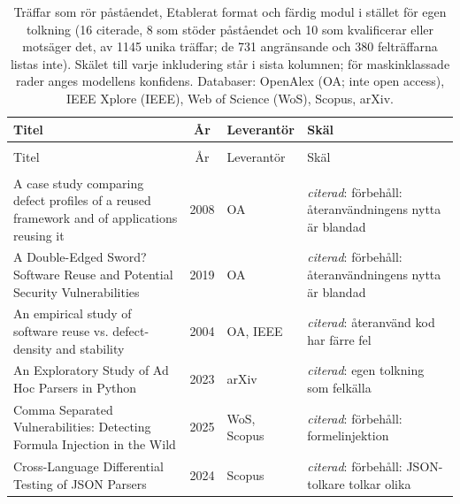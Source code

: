 
\begingroup\footnotesize
\begin{longtable}{@{}%
  >{\raggedright\arraybackslash}p{}c%
  >{\raggedright\arraybackslash}p{}%
  >{\raggedright\arraybackslash}p{}@{}}
\caption{Träffar som rör påståendet, Etablerat format och färdig modul i stället för egen tolkning (16 citerade, 8 som stöder påståendet och 10 som kvalificerar eller motsäger det, av 1145 unika träffar; de 731 angränsande och 380 felträffarna listas inte). Skälet till varje inkludering står i sista kolumnen; för maskinklassade rader anges modellens konfidens. Databaser: OpenAlex (OA; inte open access), IEEE Xplore (IEEE), Web of Science (WoS), Scopus, arXiv.}\label{tab:sok-standardformat}\\
\toprule
Titel & År & Leverantör & Skäl \\
\midrule
\endfirsthead
\multicolumn{4}{@{}l}{\emph{\tablename~\thetable{} (forts.)}}\\
\toprule
Titel & År & Leverantör & Skäl \\
\midrule
\endhead
\midrule \multicolumn{4}{r@{}}{\emph{forts.\ på nästa sida}}\\
\endfoot
\bottomrule
\endlastfoot
A case study comparing defect profiles of a reused framework and of applications reusing it & 2008 & OA & \emph{citerad}: förbehåll: återanvändningens nytta är blandad \\
A Double-Edged Sword? Software Reuse and Potential Security Vulnerabilities & 2019 & OA & \emph{citerad}: förbehåll: återanvändningens nytta är blandad \\
An empirical study of software reuse vs. defect-density and stability & 2004 & OA, IEEE & \emph{citerad}: återanvänd kod har färre fel \\
An Exploratory Study of Ad Hoc Parsers in Python & 2023 & arXiv & \emph{citerad}: egen tolkning som felkälla \\
Comma Separated Vulnerabilities: Detecting Formula Injection in the Wild & 2025 & WoS, Scopus & \emph{citerad}: förbehåll: formelinjektion \\
Cross-Language Differential Testing of JSON Parsers & 2024 & Scopus & \emph{citerad}: förbehåll: JSON-tolkare tolkar olika \\

\end{longtable}
